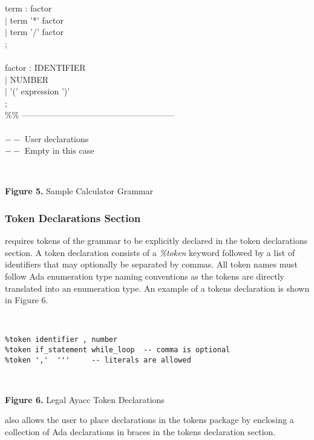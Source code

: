 \begin{tabbing}
term       : factor\\
\>\>\>           $|$ term '*' factor\\
\>\>\>           $|$ term '/' factor\\
\>\>\>           ;\\
\\
factor     : IDENTIFIER\\
\>\>\>           $|$ NUMBER\\
\>\>\>           $|$ '(' expression ')'\\
\>\>\>           ;\\
\%\% ------------------------------------------------------\\
\\
$--$ User declarations\\
$--$ Empty in this case\\
\end{tabbing}
\noindent\hspace{-0.05in}\hrulefill\hspace{0.0in}\\
\centerline{{\bf Figure 5.} Sample Calculator Grammar}
\subsubsection{Token Declarations Section}
\ayacc requires tokens of the grammar to be explicitly declared
in the token declarations section.  A token declaration consists of a
{\it \%token}
keyword followed  by a list of identifiers that may
optionally be separated by commas.  All token names must follow
Ada enumeration type naming conventions as the tokens are directly
translated into an enumeration type.  An example of a
tokens declaration is shown in Figure 6.

\noindent\hspace{-0.05in}\hrulefill\hspace{0.0in}\\
\vspace{-0.2in}
\begin{verbatim}
%token identifier , number
%token if_statement while_loop	-- comma is optional
%token ','  '''		-- literals are allowed
\end{verbatim}
\hspace{-0.05in}\hrulefill\hspace{0.0in}\\
\centerline{{\bf Figure 6.} Legal Ayacc Token Declarations}
\ayacc also allows the user to place declarations in the tokens package by
enclosing a collection of Ada declarations in braces
in the tokens declaration section.
